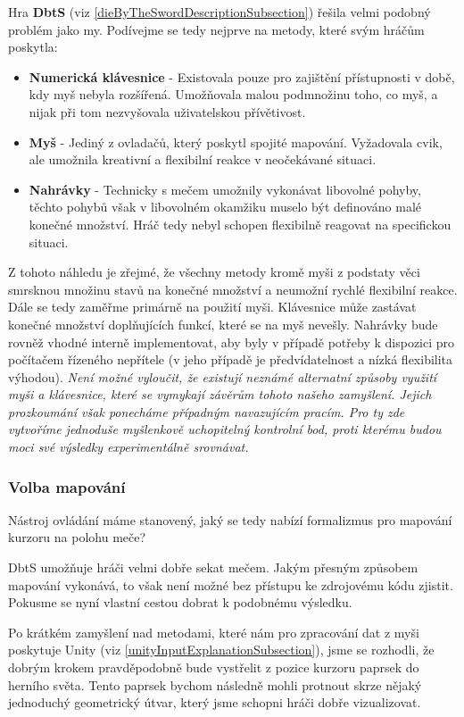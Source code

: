 \bigbreak

Hra \textbf{\acl{DbtS}} (viz \ref{dieByTheSwordDescriptionSubsection}) řešila velmi podobný problém jako my. Podívejme se tedy nejprve na metody, které svým hráčům poskytla:
\begin{itemize}
    \item \textbf{Numerická klávesnice} - Existovala pouze pro zajištění přístupnosti v době, kdy myš nebyla rozšířená. Umožňovala malou podmnožinu toho, co myš, a nijak při tom nezvyšovala uživatelskou přívětivost.
    \item \textbf{Myš} - Jediný z ovladačů, který poskytl spojité mapování. Vyžadovala cvik, ale umožnila kreativní a flexibilní reakce v neočekávané situaci.
    \item \textbf{Nahrávky} - Technicky s mečem umožnily vykonávat libovolné pohyby, těchto pohybů však v libovolném okamžiku muselo být definováno malé konečné množství. Hráč tedy nebyl schopen flexibilně reagovat na specifickou situaci. 
\end{itemize}
Z tohoto náhledu je zřejmé, že všechny metody kromě myši z podstaty věci smrsknou množinu stavů na konečné množství a neumožní rychlé flexibilní reakce. Dále se tedy zaměřme primárně na použití myši. Klávesnice může zastávat konečné množství doplňujících funkcí, které se na myš nevešly. Nahrávky bude rovněž vhodné interně implementovat, aby byly v případě potřeby k dispozici pro počítačem řízeného nepřítele (v jeho případě je předvídatelnost a nízká flexibilita výhodou).
\bigbreak
\textit{Není možné vyloučit, že existují neznámé alternatní způsoby využití myši a klávesnice, které se vymykají závěrům tohoto našeho zamyšlení. Jejich prozkoumání však ponecháme případným navazujícím pracím. Pro ty zde vytvoříme jednoduše myšlenkově uchopitelný kontrolní bod, proti kterému budou moci své výsledky experimentálně srovnávat.}

\subsubsection*{Volba mapování}

Nástroj ovládání máme stanovený, jaký se tedy nabízí formalizmus pro mapování kurzoru na polohu meče?

\acl{DbtS} umožňuje hráči velmi dobře sekat mečem. Jakým přesným způsobem mapování vykonává, to však není možné bez přístupu ke zdrojovému kódu zjistit. Pokusme se nyní vlastní cestou dobrat k podobnému výsledku.

Po krátkém zamyšlení nad metodami, které nám pro zpracování dat z myši poskytuje Unity (viz \ref{unityInputExplanationSubsection}), jsme se rozhodli, že dobrým krokem pravděpodobně bude vystřelit z pozice kurzoru paprsek do herního světa. Tento paprsek bychom následně mohli protnout skrze nějaký jednoduchý geometrický útvar, který jsme schopni hráči dobře vizualizovat. 

